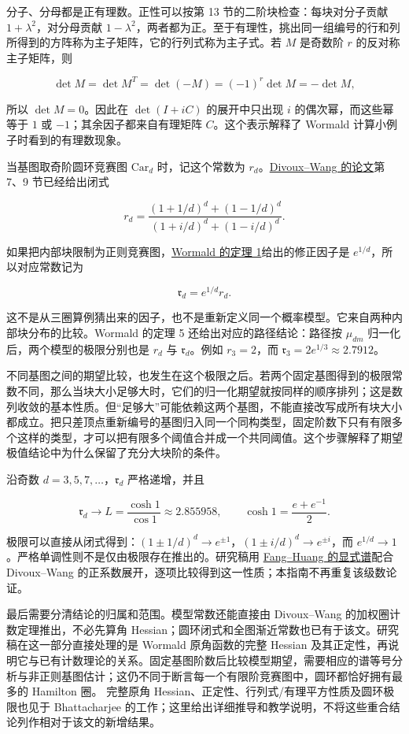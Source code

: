 \documentclass[11pt,a4paper]{article}
\begin{document}
分子、分母都是正有理数。正性可以按第 13 节的二阶块检查：每块对分子贡献 \(1+\lambda^2\)，对分母贡献 \(1-\lambda^2\)，两者都为正。至于有理性，挑出同一组编号的行和列所得到的方阵称为主子矩阵，它的行列式称为主子式。若 \(M\) 是奇数阶 \(r\) 的反对称主子矩阵，则

\[\det M=\det M^T=\det(-M)=(-1)^r\det M=-\det M,\]

所以 \(\det M=0\)。因此在 \(\det(I+iC)\) 的展开中只出现 \(i\) 的偶次幂，而这些幂等于 \(1\) 或 \(-1\)；其余因子都来自有理矩阵 \(C\)。这个表示解释了 Wormald 计算小例子时看到的有理数现象。

当基图取奇阶圆环竞赛图 \(\mathrm{Car}_d\) 时，记这个常数为 \(r_d\)。\href{https://arxiv.org/abs/2610.23755v1}{Divoux--Wang 的论文}第 7、9 节已经给出闭式

\[r_d=\frac{(1+1/d)^d+(1-1/d)^d}
{(1+i/d)^d+(1-i/d)^d}.\]

如果把内部块限制为正则竞赛图，\href{https://arxiv.org/html/2610.16245v1}{Wormald 的定理 1}给出的修正因子是 \(e^{1/d}\)，所以对应常数记为

\[\mathfrak r_d=e^{1/d}r_d.\]

这不是从三圈算例猜出来的因子，也不是重新定义同一个概率模型。它来自两种内部块分布的比较。Wormald 的定理 5 还给出对应的路径结论：路径按 \(\mu_{dm}\) 归一化后，两个模型的极限分别也是 \(r_d\) 与 \(\mathfrak r_d\)。例如 \(r_3=2\)，而 \(\mathfrak r_3=2e^{1/3}\approx2.7912\)。

不同基图之间的期望比较，也发生在这个极限之后。若两个固定基图得到的极限常数不同，那么当块大小足够大时，它们的归一化期望就按同样的顺序排列；这是数列收敛的基本性质。但``足够大''可能依赖这两个基图，不能直接改写成所有块大小都成立。把只差顶点重新编号的基图归入同一个同构类型，固定阶数下只有有限多个这样的类型，才可以把有限多个阈值合并成一个共同阈值。这个步骤解释了期望极值结论中为什么保留了充分大块阶的条件。

沿奇数 \(d=3,5,7,\ldots\)，\(\mathfrak r_d\) 严格递增，并且

\[\mathfrak r_d\longrightarrow
L=\frac{\cosh1}{\cos1}\approx2.855958,
\qquad \cosh1=\frac{e+e^{-1}}2.\]

极限可以直接从闭式得到：\((1\pm1/d)^d\to e^{\pm1}\)，\((1\pm i/d)^d\to e^{\pm i}\)，而 \(e^{1/d}\to1\)。严格单调性则不是仅由极限存在推出的。研究稿用 \href{https://arxiv.org/html/2608.06238v1}{Fang--Huang 的显式谱}配合 Divoux--Wang 的正系数展开，逐项比较得到这一性质；本指南不再重复该级数论证。

最后需要分清结论的归属和范围。模型常数还能直接由 Divoux--Wang 的加权圈计数定理推出，不必先算角 Hessian；圆环闭式和全图渐近常数也已有于该文。研究稿在这一部分直接处理的是 Wormald 原角函数的完整 Hessian 及其正定性，再说明它与已有计数理论的关系。固定基图阶数后比较模型期望，需要相应的谱等号分析与非正则基图估计；这仍不同于断言每一个有限阶竞赛图中，圆环都恰好拥有最多的 Hamilton 圈。 完整原角 Hessian、正定性、行列式/有理平方性质及圆环极限也见于 Bhattacharjee 的工作；这里给出详细推导和教学说明，不将这些重合结论列作相对于该文的新增结果。
\end{document}
